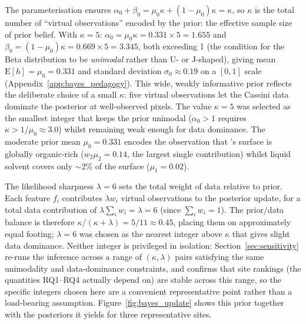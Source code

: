 The parameterisation ensures $\alpha_0 + \beta_0 = \mu_0\kappa + (1-\mu_0)\kappa = \kappa$, so $\kappa$ is the total number of ``virtual observations'' encoded by the prior: the effective sample size of prior belief.  With $\kappa = 5$: $\alpha_0 = \mu_0\kappa = 0.331 \times 5 = 1.655$ and $\beta_0 = (1-\mu_0)\kappa = 0.669 \times 5 = 3.345$, both exceeding 1 (the condition for the Beta distribution to be \textit{unimodal} rather than U- or J-shaped), giving mean $\mathrm{E}[h] = \mu_0 = 0.331$ and standard deviation $\sigma_0 \approx 0.19$ on a $[0,1]$ scale (Appendix~\ref{app:bayes_pedagogy}).  This wide, weakly informative prior reflects the deliberate choice of a small $\kappa$: five virtual observations let the Cassini data dominate the posterior at well-observed pixels.  The value $\kappa = 5$ was selected as the smallest integer that keeps the prior unimodal ($\alpha_0 > 1$ requires $\kappa > 1/\mu_0 \approx 3.0$) whilst remaining weak enough for data dominance.  The moderate prior mean $\mu_0 = 0.331$ encodes the observation that \titan{}'s surface is globally organic-rich ($w_2\mu_2 = 0.14$, the largest single contribution) whilst liquid solvent covers only $\sim$2\% of the surface ($\mu_1 = 0.02$).

The likelihood sharpness $\lambda = 6$ sets the total weight of data relative to prior.  Each feature $f_i$ contributes $\lambda w_i$ virtual observations to the posterior update, for a total data contribution of $\lambda \sum_i w_i = \lambda = 6$ (since $\sum_i w_i = 1$).  The prior/data balance is therefore $\kappa/(\kappa+\lambda) = 5/11 \approx 0.45$, placing them on approximately equal footing; $\lambda = 6$ was chosen as the nearest integer above $\kappa$ that gives slight data dominance.  Neither integer is privileged in isolation: Section~\ref{sec:sensitivity} re-runs the inference across a range of $(\kappa,\lambda)$ pairs satisfying the same unimodality and data-dominance constraints, and confirms that site rankings (the quantities RQ1--RQ4 actually depend on) are stable across this range, so the specific integers chosen here are a convenient representative point rather than a load-bearing assumption.  Figure~\ref{fig:bayes_update} shows this prior together with the posteriors it yields for three representative sites.

